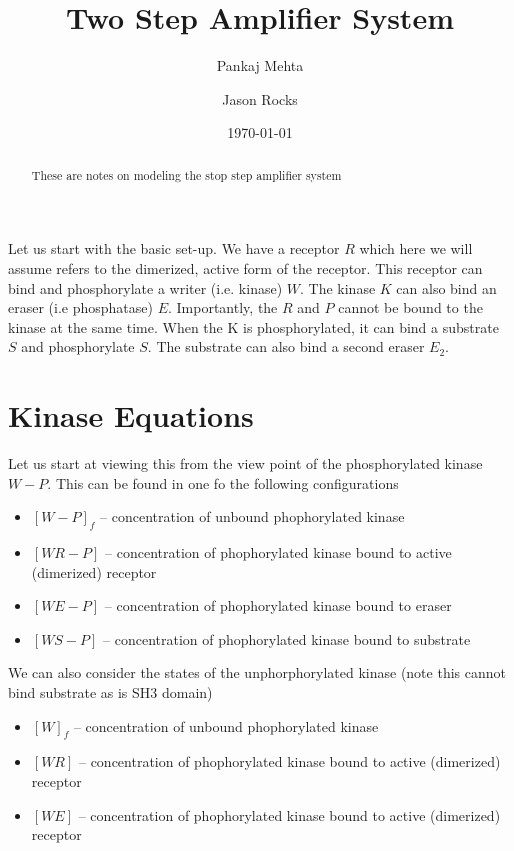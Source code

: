 \documentclass[preprint,onecolumn,amsmath]{revtex4-1}
\begin{document}
\title{Two Step Amplifier System}

\author{Pankaj Mehta}
\author{Jason Rocks}

\date{\today}

\begin{abstract}
These are notes on modeling the stop step amplifier system
\end{abstract}

\maketitle

Let us start with the basic set-up. We have a receptor $R$ which here we will assume refers to the dimerized, active form of the receptor. This
receptor can bind and phosphorylate a writer (i.e. kinase) $W$. The kinase $K$ can also bind an eraser (i.e phosphatase) $E$. Importantly, the $R$ and $P$ cannot
be bound to the kinase at the same time. When the K is phosphorylated, it can bind a substrate $S$ and phosphorylate $S$. The substrate can also bind
a second eraser $E_2$.

\section{Kinase Equations}
Let us start at viewing this from the view point of the phosphorylated kinase $W-P$. This can be found in one fo the following configurations
\begin{itemize}
\item $[W-P]_f$ -- concentration of unbound phophorylated kinase 
\item $[WR-P]$ -- concentration of  phophorylated kinase bound to active (dimerized) receptor  
\item $[WE-P]$ -- concentration of  phophorylated kinase bound to eraser  
\item $[WS-P]$ -- concentration of phophorylated kinase bound to substrate
\end{itemize}
We can also consider the states of the unphorphorylated kinase (note this cannot bind substrate as is SH3 domain)
\begin{itemize}
\item $[W]_f$ -- concentration of unbound phophorylated kinase 
\item $[WR]$ -- concentration of  phophorylated kinase bound to active (dimerized) receptor  
\item $[WE]$ -- concentration of  phophorylated kinase bound to active (dimerized) receptor  
\end{itemize}
\end{document}
